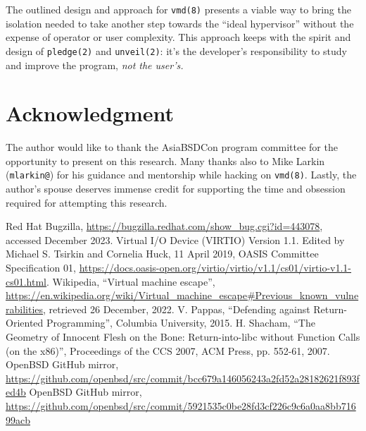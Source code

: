 \documentclass[conference]{IEEEtran}
\begin{document}
The outlined design and approach for \texttt{vmd(8)} presents a viable
way to bring the isolation needed to take another step towards the
``ideal hypervisor'' without the expense of operator or user
complexity. This approach keeps with the spirit and design of
\texttt{pledge(2)} and \texttt{unveil(2)}: it's the developer's
responsibility to study and improve the program, \emph{not the
user's.}


\vspace{5mm}
\section*{Acknowledgment}
The author would like to thank the AsiaBSDCon program committee for
the opportunity to present on this research. Many thanks also to Mike
Larkin (\texttt{mlarkin@}) for his guidance and mentorship while
hacking on \texttt{vmd(8)}. Lastly, the author's spouse deserves
immense credit for supporting the time and obsession required for
attempting this research.


\vspace{5mm}
\begin{thebibliography}{00}
 Red Hat Bugzilla, \url{https://bugzilla.redhat.com/show_bug.cgi?id=443078}, accessed December 2023.
 Virtual I/O Device (VIRTIO) Version 1.1. Edited by Michael S. Tsirkin and Cornelia Huck, 11 April 2019, OASIS Committee Specification 01, \url{https://docs.oasis-open.org/virtio/virtio/v1.1/cs01/virtio-v1.1-cs01.html}.
 Wikipedia, ``Virtual machine escape'', \url{https://en.wikipedia.org/wiki/Virtual_machine_escape#Previous_known_vulnerabilities}, retrieved 26 December, 2022.
   V. Pappas, ``Defending against Return-Oriented Programming'', Columbia University, 2015.
 H. Shacham, ``The Geometry of Innocent Flesh on the Bone:
  Return-into-libc without Function Calls (on the x86)'', Proceedings of the CCS 2007, ACM Press, pp. 552-61, 2007.
 OpenBSD GitHub mirror, \url{https://github.com/openbsd/src/commit/bcc679a146056243a2fd52a28182621f893fed4b}
 OpenBSD GitHub mirror, \url{https://github.com/openbsd/src/commit/5921535c0be28fd3cf226c9c6a0aa8bb71699acb}
\end{thebibliography}
\end{document}
